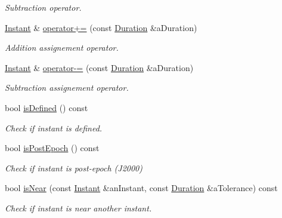 \begin{DoxyCompactItemize}
\begin{DoxyCompactList}\small\item\em Subtraction operator. \end{DoxyCompactList}\item 
\hyperlink{classlibrary_1_1physics_1_1time_1_1_instant}{Instant} \& \hyperlink{classlibrary_1_1physics_1_1time_1_1_instant_a91febb93e31d68b4fe02910f0dbfa365}{operator+=} (const \hyperlink{classlibrary_1_1physics_1_1time_1_1_duration}{Duration} \&a\+Duration)
\begin{DoxyCompactList}\small\item\em Addition assignement operator. \end{DoxyCompactList}\item 
\hyperlink{classlibrary_1_1physics_1_1time_1_1_instant}{Instant} \& \hyperlink{classlibrary_1_1physics_1_1time_1_1_instant_a629531fc4507a3ef0375f88696fed34e}{operator-\/=} (const \hyperlink{classlibrary_1_1physics_1_1time_1_1_duration}{Duration} \&a\+Duration)
\begin{DoxyCompactList}\small\item\em Subtraction assignement operator. \end{DoxyCompactList}\item 
bool \hyperlink{classlibrary_1_1physics_1_1time_1_1_instant_aaef81e773a2d3059612b0d99dc7cf661}{is\+Defined} () const
\begin{DoxyCompactList}\small\item\em Check if instant is defined. \end{DoxyCompactList}\item 
bool \hyperlink{classlibrary_1_1physics_1_1time_1_1_instant_a649a2505c26b68b17ed7a80429b599ee}{is\+Post\+Epoch} () const
\begin{DoxyCompactList}\small\item\em Check if instant is post-\/epoch (J2000) \end{DoxyCompactList}\item 
bool \hyperlink{classlibrary_1_1physics_1_1time_1_1_instant_a33c9efd22d0bbf1dd0cdd934d9587a2a}{is\+Near} (const \hyperlink{classlibrary_1_1physics_1_1time_1_1_instant}{Instant} \&an\+Instant, const \hyperlink{classlibrary_1_1physics_1_1time_1_1_duration}{Duration} \&a\+Tolerance) const
\begin{DoxyCompactList}\small\item\em Check if instant is near another instant. \end{DoxyCompactList}\item 

\end{DoxyCompactItemize}
